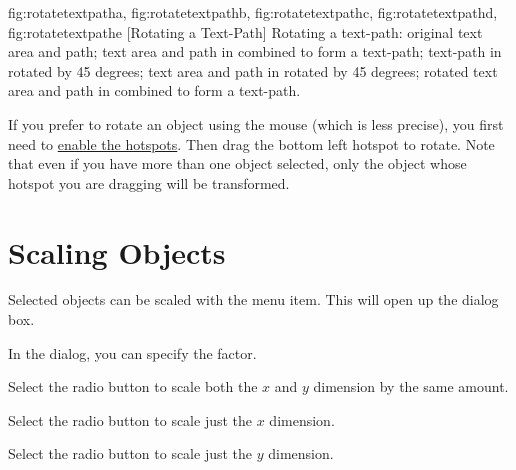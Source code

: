{
 {fig:rotatetextpatha}{}{},
 {fig:rotatetextpathb}{}{},
 {fig:rotatetextpathc}{}{},
 {fig:rotatetextpathd}{}{},
 {fig:rotatetextpathe}{}{}
}
[Rotating a Text-Path]
{Rotating a text-path: 
 original text area and path; 
 text area and path in
 combined to form a text-path;
 text-path in
 rotated by 45 degrees;
 text area and path in
 rotated by 45 degrees;
 rotated text area and
path in  combined to form a text-path.}

If you prefer to rotate an \gls{object} using the mouse (which is
less precise), you first need to \hyperref[mi:hotspots]{enable the hotspots}.
Then drag the bottom left hotspot to rotate. Note that even if you
have more than one object selected, only the object whose hotspot you
are dragging will be transformed.



\section{Scaling Objects}\label{sec:scaleobjects}


Selected \glspl{object} can be scaled with the
 menu item. This will open up the
 dialog box.


In the  dialog, you can specify the
 factor.


Select the  radio button to scale both the
$x$ and $y$ dimension by the same amount.


Select the  radio button to scale just the
$x$ dimension.


Select the  radio button to scale just the
$y$ dimension.

